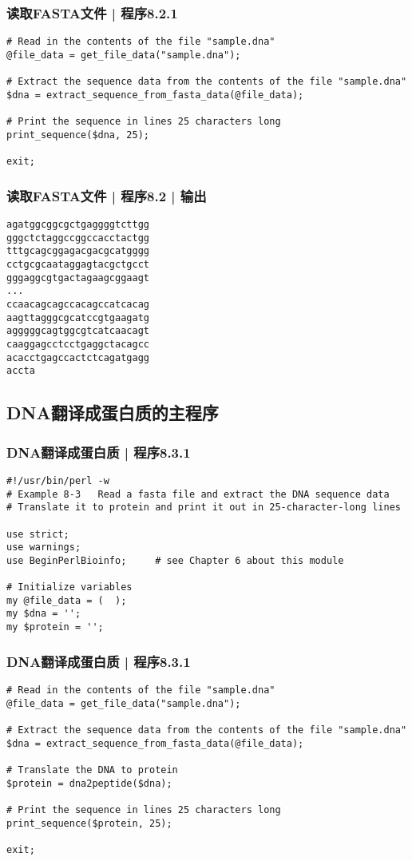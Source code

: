 \begin{frame}[fragile]
  \frametitle{读取FASTA文件 | 程序8.2.1}
\begin{lstlisting}[firstnumber=12]
# Read in the contents of the file "sample.dna"
@file_data = get_file_data("sample.dna");

# Extract the sequence data from the contents of the file "sample.dna"
$dna = extract_sequence_from_fasta_data(@file_data);

# Print the sequence in lines 25 characters long
print_sequence($dna, 25);

exit;
\end{lstlisting}
\end{frame}

\begin{frame}[fragile]
  \frametitle{读取FASTA文件 | 程序8.2 | 输出}
\begin{lstlisting}
agatggcggcgctgaggggtcttgg
gggctctaggccggccacctactgg
tttgcagcggagacgacgcatgggg
cctgcgcaataggagtacgctgcct
gggaggcgtgactagaagcggaagt
...
ccaacagcagccacagccatcacag
aagttagggcgcatccgtgaagatg
agggggcagtggcgtcatcaacagt
caaggagcctcctgaggctacagcc
acacctgagccactctcagatgagg
accta
\end{lstlisting}
\end{frame}

\subsection{DNA翻译成蛋白质的主程序}
\begin{frame}[fragile]
  \frametitle{DNA翻译成蛋白质 | 程序8.3.1}
\begin{lstlisting}[firstnumber=1]
#!/usr/bin/perl -w
# Example 8-3   Read a fasta file and extract the DNA sequence data
# Translate it to protein and print it out in 25-character-long lines

use strict;
use warnings;
use BeginPerlBioinfo;     # see Chapter 6 about this module

# Initialize variables
my @file_data = (  );
my $dna = '';
my $protein = '';
\end{lstlisting}
\end{frame}

\begin{frame}[fragile]
  \frametitle{DNA翻译成蛋白质 | 程序8.3.1}
\begin{lstlisting}[firstnumber=13,basicstyle=\small\tt,numberstyle=\footnotesize]
# Read in the contents of the file "sample.dna"
@file_data = get_file_data("sample.dna");

# Extract the sequence data from the contents of the file "sample.dna"
$dna = extract_sequence_from_fasta_data(@file_data);

# Translate the DNA to protein
$protein = dna2peptide($dna);

# Print the sequence in lines 25 characters long
print_sequence($protein, 25);

exit;
\end{lstlisting}
\end{frame}

